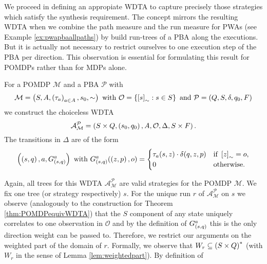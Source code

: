 We proceed in defining an appropiate \ac{WDTA} to capture precisely those 
strategies which satisfy the synthesis requirement. The concept mirrors the
resulting \ac{WDTA} when we combine the path measure and the run measure for
\acp{PWA} (see Example \ref{ex:pwapbaallpaths}) by build run-trees of a 
\ac{PBA} along the executions. But it is actually not necessary to restrict
ourselves to one execution step of the \ac{PBA} per direction. This 
observation is essential for formulating this result for \acp{POMDP} rather 
than for \acp{MDP} alone.
\begin{definition}
  For a \ac{POMDP} $\mathcal{M}$ and a \ac{PBA} $\mathcal{P}$ with
  \begin{equation*}
    \mathcal{M} = \left(S, A, \left(\tau_{a}\right)_{a\in A}, s_{0}, \sim\right)
    \text{ with }
    \mathcal{O} = \left\{\left[s\right]_{\sim}: s\in S\right\}
    \text{ and }
    \mathcal{P} = \left(Q, S, \delta, q_{0}, F\right)
  \end{equation*} 
  we construct the choiceless \ac{WDTA}
  \begin{equation*}
    \mathcal{A}_{\mathcal{M}}^{\mathcal{P}} = \left(
      S\times Q, \left(s_{0}, q_{0}\right), A, \mathcal{O}, \Delta, S\times F
    \right).
  \end{equation*}
  The transitions in $\Delta$ are of the form
  \begin{equation*}
    \left(\left(s, q\right), a, G_{\left(s,q\right)}^{a}\right)
    \text{ with }
    G_{\left(s,q\right)}^{a}(\left(z,p\right), o) = \begin{cases}
      \tau_{a}(s, z)\cdot\delta(q, z, p)&\text{if }\left[z\right]_{\sim} = o,\\
      0&\text{otherwise}.
    \end{cases}
  \end{equation*}
\end{definition}
Again, all trees for this \ac{WDTA} $\mathcal{A}_{\mathcal{M}}^{\mathcal{P}}$
are valid strategies for the \ac{POMDP} $\mathcal{M}$. We fix one tree (or
strategy respectively) $s$. For the unique run $r$ of
$\mathcal{A}_{\mathcal{M}}^{\mathcal{P}}$ on $s$ we observe (analogously to the
construction for Theorem \ref{thm:POMDPequivWDTA}) that the $S$ component of
any state uniquely correlates to one observation in $\mathcal{O}$ and by the
definition of $G_{\left(s, q\right)}^{a}$ this is the only direction weight can be
passed to. Therefore, we restrict our arguments on the weighted part of the
domain of $r$. Formally, we observe that $W_{r}\subseteq\left(S\times Q\right)^{*}$
(with $W_{r}$ in the sense of Lemma \ref{lem:weightedpart}). By definition of
